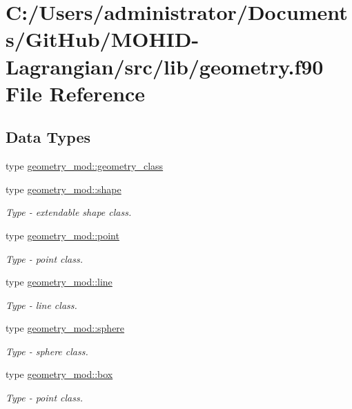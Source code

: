 \hypertarget{geometry_8f90}{}\section{C\+:/\+Users/administrator/\+Documents/\+Git\+Hub/\+M\+O\+H\+I\+D-\/\+Lagrangian/src/lib/geometry.f90 File Reference}
\label{geometry_8f90}
\subsection*{Data Types}
\begin{DoxyCompactItemize}
\item 
type \mbox{\hyperlink{structgeometry__mod_1_1geometry__class}{geometry\+\_\+mod\+::geometry\+\_\+class}}
\item 
type \mbox{\hyperlink{structgeometry__mod_1_1shape}{geometry\+\_\+mod\+::shape}}
\begin{DoxyCompactList}\small\item\em Type -\/ extendable shape class. \end{DoxyCompactList}\item 
type \mbox{\hyperlink{structgeometry__mod_1_1point}{geometry\+\_\+mod\+::point}}
\begin{DoxyCompactList}\small\item\em Type -\/ point class. \end{DoxyCompactList}\item 
type \mbox{\hyperlink{structgeometry__mod_1_1line}{geometry\+\_\+mod\+::line}}
\begin{DoxyCompactList}\small\item\em Type -\/ line class. \end{DoxyCompactList}\item 
type \mbox{\hyperlink{structgeometry__mod_1_1sphere}{geometry\+\_\+mod\+::sphere}}
\begin{DoxyCompactList}\small\item\em Type -\/ sphere class. \end{DoxyCompactList}\item 
type \mbox{\hyperlink{structgeometry__mod_1_1box}{geometry\+\_\+mod\+::box}}
\begin{DoxyCompactList}\small\item\em Type -\/ point class. \end{DoxyCompactList}\end{DoxyCompactItemize}
